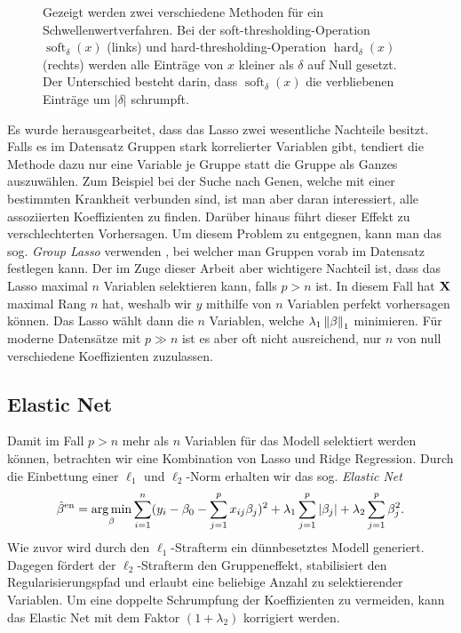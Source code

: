 \begin{figure}
\begin{subfigure}{0.4\textwidth}
	\label{soft_thresholding}
	\end{subfigure}
\caption{Gezeigt werden zwei verschiedene Methoden für ein Schwellenwertverfahren. Bei der soft-thresholding-Operation $\operatorname{soft}_{\delta}(x)$ (links) und hard-thresholding-Operation $\operatorname{hard}_{\delta}(x)$ (rechts) werden alle Einträge von $x$ kleiner als $\delta$ auf Null gesetzt. Der Unterschied besteht darin, dass $\operatorname{soft}_{\delta}(x)$ die verbliebenen Einträge um $|\delta|$ schrumpft.}
\label{thresholding_figure}
\end{figure}

Es wurde herausgearbeitet, dass das Lasso zwei wesentliche Nachteile besitzt. Falls es im Datensatz Gruppen stark korrelierter Variablen gibt, tendiert die Methode dazu nur eine Variable je Gruppe statt die Gruppe als Ganzes auszuwählen. Zum Beispiel bei der Suche nach Genen, welche mit einer bestimmten Krankheit verbunden sind, ist man aber daran interessiert, alle assoziierten Koeffizienten zu finden. Darüber hinaus führt dieser Effekt zu verschlechterten Vorhersagen. Um diesem Problem zu entgegnen, kann man das sog. \textit{Group Lasso} verwenden \cite{yuan}, bei welcher man Gruppen vorab im Datensatz festlegen kann. Der im Zuge dieser Arbeit aber wichtigere Nachteil ist, dass das Lasso maximal $n$ Variablen selektieren kann, falls $p > n$ ist. In diesem Fall hat $\mathbf{X}$ maximal Rang $n$ hat, weshalb wir $y$ mithilfe von $n$ Variablen perfekt vorhersagen können. Das Lasso wählt dann die $n$ Variablen, welche $\lambda_1\left\lVert \beta \right\rVert_1$ minimieren. Für moderne Datensätze mit $p \gg n$ ist es aber oft nicht ausreichend, nur $n$ von null verschiedene Koeffizienten zuzulassen.




\subsection{Elastic Net}
\label{elastic_net}

Damit im Fall $p > n$ mehr als $n$ Variablen für das Modell selektiert werden können, betrachten wir eine Kombination von Lasso und Ridge Regression. Durch die Einbettung einer $\ell_1$ und $\ell_2$-Norm erhalten wir das sog. \textit{Elastic Net} \cite{zou_elasticnet}
\begin{align}
\label{elastic_net_formulation}
\hat{\beta}^{\text{en}} = \operatorname*{arg\,min}_{\beta} \sum_{i=1}^{n}(y_i - \beta_0 - \sum_{j=1}^p x_{ij}\beta_j)^2 + \lambda_1\sum_{j=1}^p \left|\beta_j\right| + \lambda_2\sum_{j=1}^p \beta_j^2.
\end{align}
Wie zuvor wird durch den $\ell_1$-Strafterm ein dünnbesetztes Modell generiert. Dagegen fördert der $\ell_2$-Strafterm den Gruppeneffekt, stabilisiert den Regularisierungspfad und erlaubt eine beliebige Anzahl zu selektierender Variablen. Um eine doppelte Schrumpfung der Koeffizienten zu vermeiden, kann das Elastic Net mit dem Faktor $(1 + \lambda_2)$ korrigiert werden. 

